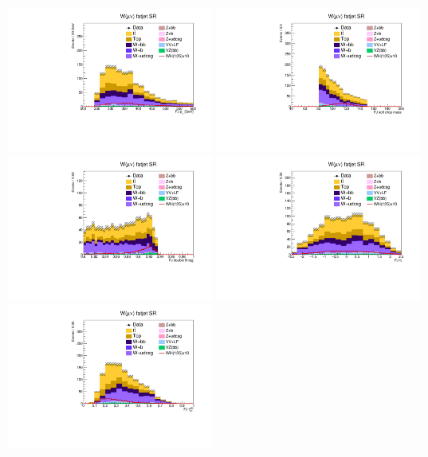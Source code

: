 \begin{figure}[tbp]
  \begin{center}
    \includegraphics[width=0.48\textwidth]{figures/wlnhbb2016/boosted/WmnWHFJSR_fj1Pt.pdf}
    \includegraphics[width=0.48\textwidth]{figures/wlnhbb2016/boosted/WmnWHFJSR_fj1MSD_corr.pdf}
    \includegraphics[width=0.48\textwidth]{figures/wlnhbb2016/boosted/WmnWHFJSR_fj1DoubleCSV.pdf}
    \includegraphics[width=0.48\textwidth]{figures/wlnhbb2016/boosted/WmnWHFJSR_fj1Eta.pdf}
    \includegraphics[width=0.48\textwidth]{figures/wlnhbb2016/boosted/WmnWHFJSR_fj1Tau21SD.pdf}

\end{center}
\end{figure}
